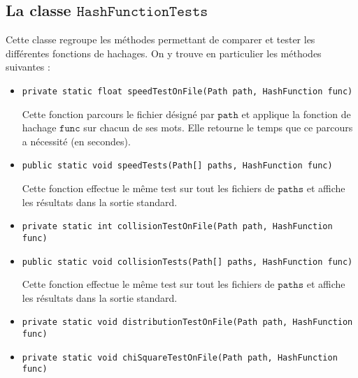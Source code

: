 \documentclass[12pt,a4paper,titlepage]{article}
\newcommand{\class}[1]{$\mathtt{#1}$}
\begin{document}
\subsection{La classe \class{HashFunctionTests}}
Cette classe regroupe les méthodes permettant de comparer et tester les différentes fonctions de hachages.
On y trouve en particulier les méthodes suivantes :
\begin{itemize}

\item \begin{lstlisting}
private static float speedTestOnFile(Path path, HashFunction func)
\end{lstlisting}
Cette fonction parcours le fichier désigné par \class{path} et applique la fonction de hachage \class{func} sur chacun de ses mots. Elle retourne le temps que ce parcours a nécessité (en secondes).

\item \begin{lstlisting}
public static void speedTests(Path[] paths, HashFunction func)
\end{lstlisting}
Cette fonction effectue le même test sur tout les fichiers de \class{paths} et affiche les résultats dans la sortie standard.

\item \begin{lstlisting}
private static int collisionTestOnFile(Path path, HashFunction func)
\end{lstlisting}

\item \begin{lstlisting}
public static void collisionTests(Path[] paths, HashFunction func)
\end{lstlisting}
Cette fonction effectue le même test sur tout les fichiers de \class{paths} et affiche les résultats dans la sortie standard.

\item \begin{lstlisting}
private static void distributionTestOnFile(Path path, HashFunction func)
\end{lstlisting}

\item \begin{lstlisting}
private static void chiSquareTestOnFile(Path path, HashFunction func)
\end{lstlisting}







\end{itemize}
\end{document}
